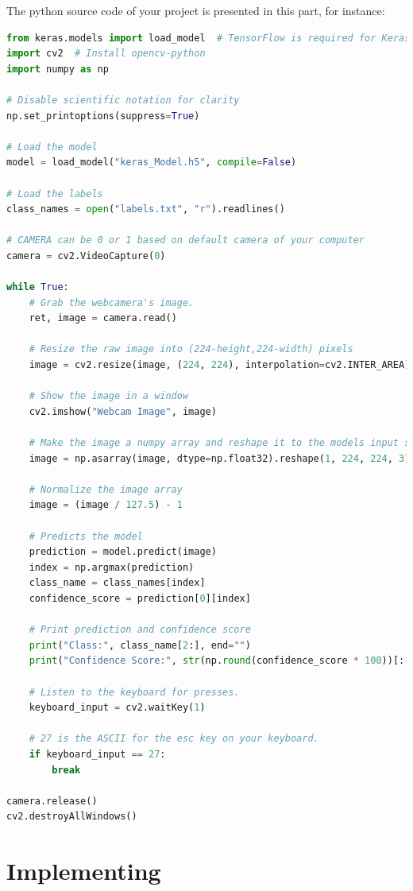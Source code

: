 \documentclass[a4paper,11pt]{article}
\theoremstyle{mytheor}
\begin{document}
The python source code of your project is presented in this part, for instance:

\begin{lstlisting}[language=Python, caption= Example of your Python code, label=test_float]
from keras.models import load_model  # TensorFlow is required for Keras to work
import cv2  # Install opencv-python
import numpy as np

# Disable scientific notation for clarity
np.set_printoptions(suppress=True)

# Load the model
model = load_model("keras_Model.h5", compile=False)

# Load the labels
class_names = open("labels.txt", "r").readlines()

# CAMERA can be 0 or 1 based on default camera of your computer
camera = cv2.VideoCapture(0)

while True:
    # Grab the webcamera's image.
    ret, image = camera.read()

    # Resize the raw image into (224-height,224-width) pixels
    image = cv2.resize(image, (224, 224), interpolation=cv2.INTER_AREA)

    # Show the image in a window
    cv2.imshow("Webcam Image", image)

    # Make the image a numpy array and reshape it to the models input shape.
    image = np.asarray(image, dtype=np.float32).reshape(1, 224, 224, 3)

    # Normalize the image array
    image = (image / 127.5) - 1

    # Predicts the model
    prediction = model.predict(image)
    index = np.argmax(prediction)
    class_name = class_names[index]
    confidence_score = prediction[0][index]

    # Print prediction and confidence score
    print("Class:", class_name[2:], end="")
    print("Confidence Score:", str(np.round(confidence_score * 100))[:-2], "%")

    # Listen to the keyboard for presses.
    keyboard_input = cv2.waitKey(1)

    # 27 is the ASCII for the esc key on your keyboard.
    if keyboard_input == 27:
        break

camera.release()
cv2.destroyAllWindows()

\end{lstlisting}

\section{Implementing}
\end{document}
